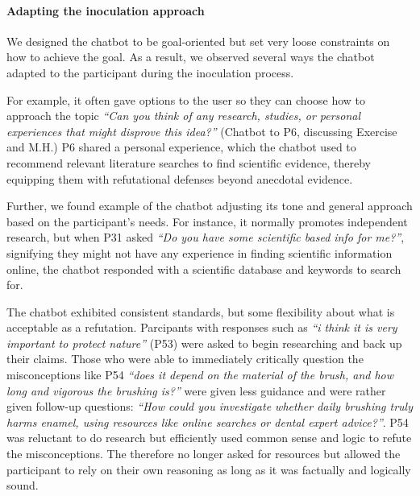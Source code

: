 \documentclass[sigconf]{acmart}
\begin{document}
\paragraph{Adapting the inoculation approach}
We designed the chatbot to be goal-oriented but set very loose constraints on how to achieve the goal. As a result, we observed several ways the chatbot adapted to the participant during the inoculation process. 

For example, it often gave options to the user so they can choose how to approach the topic \textit{``Can you think of any research, studies, or personal experiences that might disprove this idea?''} (Chatbot to P6, discussing Exercise and M.H.) 
P6 shared a personal experience, which the chatbot used to recommend relevant literature searches to find scientific evidence, thereby equipping them with refutational defenses beyond anecdotal evidence. 


Further, we found example of the chatbot adjusting its tone and general approach based on the participant's needs. For instance, it normally promotes independent research, but when P31 asked \textit{``Do you have some scientific based info for me?''}, signifying they might not have any experience in finding scientific information online, the chatbot responded with a scientific database and keywords to search for. 

The chatbot exhibited consistent standards, but some flexibility about what is acceptable as a refutation. Parcipants with responses such as \textit{``i think it is very important to protect nature''} (P53) were asked to begin researching and back up their claims. Those who were able to immediately critically question the misconceptions like P54 \textit{``does it depend on the material of the brush, and how long and vigorous the brushing is?''} were given less guidance and were rather given follow-up questions: \textit{``How could you investigate whether daily brushing truly harms enamel, using resources like online searches or dental expert advice?''}. P54 was reluctant to do research but efficiently used common sense and logic to refute the misconceptions. The therefore no longer asked for resources but allowed the participant to rely on their own reasoning as long as it was factually and logically sound.
\end{document}
